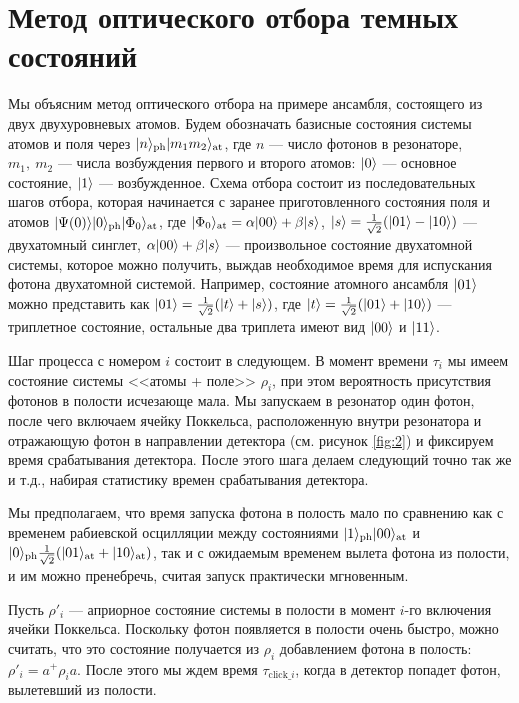 \section{Метод оптического отбора темных состояний}\label{sec:ch3/sect3}
Мы объясним метод оптического отбора на примере ансамбля, состоящего из двух двухуровневых атомов. Будем обозначать базисные состояния системы атомов и поля через $|n\rangle_{\text{ph}}|m_1m_2\rangle_{\text{at}}$, где $n$ --- число фотонов в резонаторе, $m_1,~m_2$ --- числа возбуждения первого и второго атомов: $|0\rangle$ --- основное состояние, $|1\rangle$ --- возбужденное. Схема отбора состоит из последовательных шагов отбора, которая начинается с заранее приготовленного состояния поля и атомов $|\Psi(0)\rangle|0\rangle_{\text{ph}}|\Phi_0\rangle_{\text{at}}$, где $|\Phi_{0}\rangle_{\text{at}}=\alpha |00\rangle+\beta |s\rangle$, $|s\rangle=\frac{1}{\sqrt{2}}(|01\rangle - |10\rangle)$ --- двухатомный синглет, $\alpha |00\rangle+\beta |s\rangle$ --- произвольное состояние двухатомной системы, которое можно получить, выждав необходимое время для испускания фотона двухатомной системой. Например, состояние атомного ансамбля $|01\rangle$ можно представить как $|01\rangle=\frac{1}{\sqrt 2}(|t\rangle+|s\rangle)$, где $|t\rangle=\frac{1}{\sqrt{2}}(|01\rangle+|10\rangle)$ --- триплетное состояние, остальные два триплета имеют вид $|00\rangle$ и $|11\rangle$. 

Шаг процесса с номером $i$ состоит в следующем. В момент времени $\tau_{i}$ мы имеем состояние системы <<атомы + поле>> $\rho_{i}$, при этом вероятность присутствия фотонов в полости исчезающе мала. Мы запускаем в резонатор один фотон, после чего включаем ячейку Поккельса, расположенную внутри резонатора и отражающую фотон в направлении детектора (см. рисунок \ref{fig:2}) и фиксируем время срабатывания детектора. После этого шага делаем следующий точно так же и т.д., набирая статистику времен срабатывания детектора. 

Мы предполагаем, что время запуска фотона в полость мало по сравнению как с временем  рабиевской осцилляции между состояниями $|1\rangle_{\text{ph}}|00\rangle_{\text{at}}$ и $|0\rangle_{\text{ph}}\frac{1}{\sqrt 2}(|01\rangle_{\text{at}}+|10\rangle_{\text{at}})$, так и с ожидаемым временем вылета фотона из полости, и им можно пренебречь, считая запуск практически мгновенным.

Пусть $\rho'_{i}$ --- априорное состояние системы в полости в момент $i$-го включения ячейки Поккельса. Поскольку фотон появляется в полости очень быстро, можно считать, что это состояние получается из $\rho_i$ добавлением фотона в полость: $\rho'_i=a^+\rho_ia$. После этого мы ждем время $\tau_{\text{click}\_i}$, когда в детектор попадет фотон, вылетевший из полости. 

